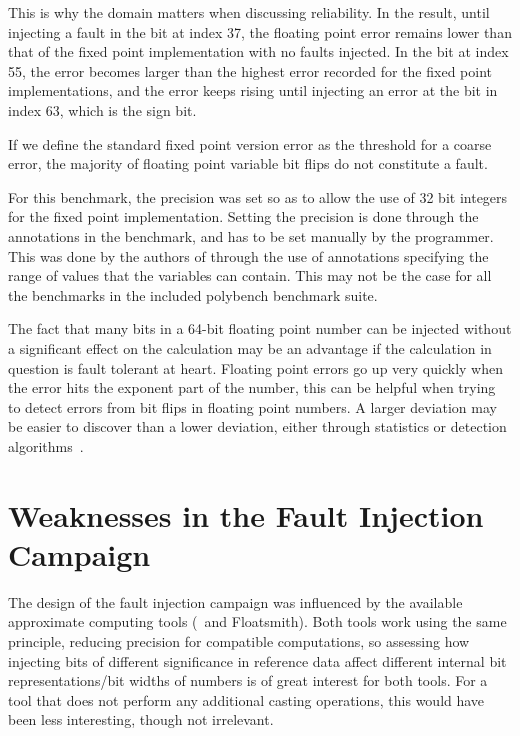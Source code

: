 This is why the domain matters when discussing reliability. In the result, until injecting a fault in the bit at index 37, the floating point error remains lower than that of the fixed point implementation with no faults injected. In the bit at index 55, the error becomes larger than the highest error recorded for the fixed point implementations, and the error keeps rising until injecting an error at the bit in index 63, which is the sign bit.

If we define the standard fixed point version error as the threshold for a coarse error, the majority of floating point variable bit flips do not constitute a fault. 

For this benchmark, the precision was set so as to allow the use of 32 bit integers for the fixed point implementation. Setting the precision is done through the annotations in the benchmark, and has to be set manually by the programmer.  This was done by the authors of \taffo{} through the use of annotations specifying the range of values that the variables can contain. This may not be the case for all the benchmarks in the included polybench benchmark suite.

 The fact that many bits in a 64-bit floating point number can be injected without a significant effect on the calculation may be an advantage if the calculation in question is fault tolerant at heart. Floating point errors go up very quickly when the error hits the exponent part of the number, this can be helpful when trying to detect errors from bit flips in floating point numbers. A larger deviation may be easier to discover than a lower deviation, either through statistics or detection algorithms~\citep{hodge2004survey}.


\section{Weaknesses in the Fault Injection Campaign}

The design of the fault injection campaign was influenced by the available approximate computing tools (\taffo\ and Floatsmith). Both tools work using the same principle, reducing precision for compatible computations, so assessing how injecting bits of different significance in reference data affect different internal bit representations/bit widths of numbers is of great interest for both tools. For a tool that does not perform any additional casting operations, this would have been less interesting, though not irrelevant. 

